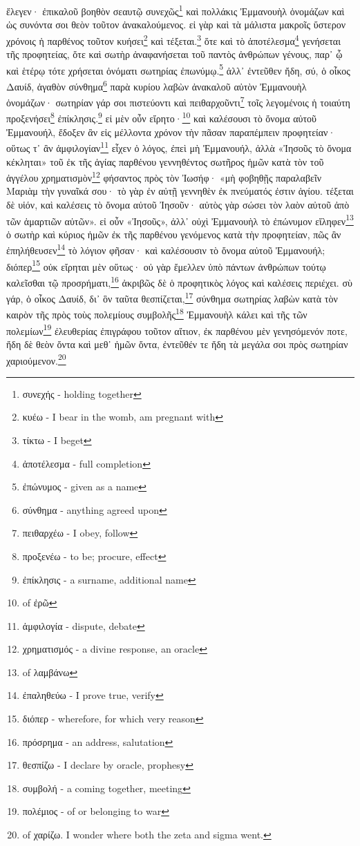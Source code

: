 ἔλεγεν·
ἐπικαλοῦ
βοηθὸν
σεαυτῷ
συνεχῶς\footnote{συνεχής - holding together}
καὶ
πολλάκις
Ἐμμανουὴλ
ὀνομάζων
καὶ
ὡς
συνόντα
σοι
θεὸν
τοῦτον
ἀνακαλούμενος.
εἰ
γὰρ
καὶ
τὰ
μάλιστα
μακροῖς
ὕστερον
χρόνοις
ἡ
παρθένος
τοῦτον
κυήσει\footnote{κυέω - I bear in the womb, am pregnant with}
καὶ
τέξεται.\footnote{τίκτω - I beget}
ὅτε
καὶ
τὸ
ἀποτέλεσμα\footnote{ἀποτέλεσμα - full completion}
γενήσεται
τῆς
προφητείας,
ὅτε
καὶ
σωτὴρ
ἀναφανήσεται
τοῦ
παντὸς
ἀνθρώπων
γένους,
παρ᾽
ᾧ
καὶ
ἑτέρῳ
τότε
χρήσεται
ὀνόματι
σωτηρίας
ἐπωνύμῳ.\footnote{ἐπώνυμος - given as a name}
ἀλλ᾽
ἐντεῦθεν
ἤδη,
σύ,
ὁ
οἶκος
Δαυίδ,
ἀγαθὸν
σύνθημα\footnote{σύνθημα - anything agreed upon}
παρὰ
κυρίου
λαβὼν
ἀνακαλοῦ
αὐτὸν
Ἐμμανουὴλ
ὀνομάζων·
σωτηρίαν
γάρ
σοι
πιστεύοντι
καὶ
πειθαρχοῦντι\footnote{πειθαρχέω - I obey, follow}
τοῖς
λεγομένοις
ἡ
τοιαύτη
προξενήσει\footnote{προξενέω - to be; procure, effect}
ἐπίκλησις.\footnote{ἐπίκλησις - a surname, additional name}
εἰ
μὲν
οὖν
εἴρητο·\footnote{ of ἐρῶ}
καὶ
καλέσουσι
τὸ
ὄνομα
αὐτοῦ
Ἐμμανουήλ,
ἔδοξεν
ἂν
εἰς
μέλλοντα
χρόνον
τὴν
πᾶσαν
παραπέμπειν
προφητείαν·
οὕτως
τ᾽
ἂν
ἀμφιλογίαν\footnote{ἀμφιλογία - dispute, debate}
εἶχεν
ὁ
λόγος,
ἐπεὶ
μὴ
Ἐμμανουήλ,
ἀλλὰ
«Ἰησοῦς
τὸ
ὄνομα
κέκληται»
τοῦ
ἐκ
τῆς
ἁγίας
παρθένου
γεννηθέντος
σωτῆρος
ἡμῶν
κατὰ
τὸν
τοῦ
ἀγγέλου
χρηματισμὸν\footnote{χρηματισμός - a divine response, an oracle}
φήσαντος
πρὸς
τὸν
Ἰωσήφ·
«μὴ
φοβηθῇς
παραλαβεῖν
Μαριὰμ
τὴν
γυναῖκά
σου·
τὸ
γὰρ
ἐν
αὐτῇ
γεννηθὲν
ἐκ
πνεύματός
ἐστιν
ἁγίου.
τέξεται
δὲ
υἱόν,
καὶ
καλέσεις
τὸ
ὄνομα
αὐτοῦ
Ἰησοῦν·
αὐτὸς
γὰρ
σώσει
τὸν
λαὸν
αὐτοῦ
ἀπὸ
τῶν
ἁμαρτιῶν
αὐτῶν».
εἰ
οὖν
«Ἰησοῦς»,
ἀλλ᾽
οὐχὶ
Ἐμμανουὴλ
τὸ
ἐπώνυμον
εἴληφεν\footnote{ of λαμβάνω}
ὁ
σωτὴρ
καὶ
κύριος
ἡμῶν
ἐκ
τῆς
παρθένου
γενόμενος
κατὰ
τὴν
προφητείαν,
πῶς
ἂν
ἐπηλήθευσεν\footnote{ἐπαληθεύω - I prove true, verify}
τὸ
λόγιον
φῆσαν·
καὶ
καλέσουσιν
τὸ
ὄνομα
αὐτοῦ
Ἐμμανουήλ;
διόπερ\footnote{διόπερ - wherefore, for which very reason}
οὐκ
εἴρηται
μὲν
οὕτως·
οὐ
γὰρ
ἔμελλεν
ὑπὸ
πάντων
ἀνθρώπων
τούτῳ
καλεῖσθαι
τῷ
προσρήματι,\footnote{πρόσρημα - an address, salutation}
ἀκριβῶς
δὲ
ὁ
προφητικὸς
λόγος
καὶ
καλέσεις
περιέχει.
σὺ
γάρ,
ὁ
οἶκος
Δαυίδ,
δι᾽
ὃν
ταῦτα
θεσπίζεται,\footnote{θεσπίζω - I declare by oracle, prophesy}
σύνθημα
σωτηρίας
λαβὼν
κατὰ
τὸν
καιρὸν
τῆς
πρὸς
τοὺς
πολεμίους
συμβολῆς\footnote{συμβολή - a coming together, meeting}
Ἐμμανουὴλ
κάλει
καὶ
τῆς
τῶν
πολεμίων\footnote{πολέμιος - of or belonging to war}
ἐλευθερίας
ἐπιγράφου
τοῦτον
αἴτιον,
ἐκ
παρθένου
μὲν
γενησόμενόν
ποτε,
ἤδη
δὲ
θεὸν
ὄντα
καὶ
μεθ᾽
ἡμῶν
ὄντα,
ἐντεῦθέν
τε
ἤδη
τὰ
μεγάλα
σοι
πρὸς
σωτηρίαν
χαριούμενον.\footnote{ of χαρίζω. I wonder where both the zeta and sigma went.}
